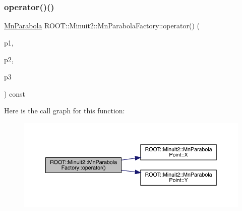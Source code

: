 \subsubsection{\texorpdfstring{operator()()}{operator()()}\hspace{0.1cm}{\footnotesize\ttfamily [1/4]}}
{\footnotesize\ttfamily \mbox{\hyperlink{classROOT_1_1Minuit2_1_1MnParabola}{Mn\+Parabola}} R\+O\+O\+T\+::\+Minuit2\+::\+Mn\+Parabola\+Factory\+::operator() (\begin{DoxyParamCaption}\item[{const \mbox{\hyperlink{classROOT_1_1Minuit2_1_1MnParabolaPoint}{Mn\+Parabola\+Point}} \&}]{p1,  }\item[{const \mbox{\hyperlink{classROOT_1_1Minuit2_1_1MnParabolaPoint}{Mn\+Parabola\+Point}} \&}]{p2,  }\item[{const \mbox{\hyperlink{classROOT_1_1Minuit2_1_1MnParabolaPoint}{Mn\+Parabola\+Point}} \&}]{p3 }\end{DoxyParamCaption}) const}

Here is the call graph for this function\+:\nopagebreak
\begin{figure}[H]
\begin{center}
\leavevmode
\includegraphics[width=350pt]{d2/dd8/classROOT_1_1Minuit2_1_1MnParabolaFactory_aa5ff96ea03013f1dcbbac298fe26e484_cgraph}
\end{center}
\end{figure}
\mbox{\label{classROOT_1_1Minuit2_1_1MnParabolaFactory_aa5ff96ea03013f1dcbbac298fe26e484}} 
